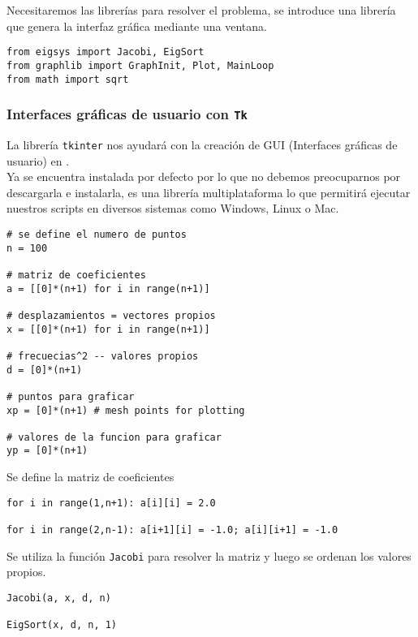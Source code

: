 \begin{frame}[fragile]
Necesitaremos las librerías para resolver el problema, se introduce una librería que genera la interfaz gráfica mediante una ventana.
\begin{lstlisting}[basicstyle=\linespread{0.9}\ttfamily\normalsize, columns=fullflexible]
from eigsys import Jacobi, EigSort
from graphlib import GraphInit, Plot, MainLoop
from math import sqrt
\end{lstlisting}
\end{frame}
\begin{frame}
\frametitle{Interfaces gráficas de usuario con \texttt{Tk}}
La librería \texttt{tkinter} nos ayudará con la creación de GUI (Interfaces gráficas de usuario) en \python.
\\
\bigskip
Ya se encuentra instalada por defecto por lo que no debemos preocuparnos por descargarla e instalarla, es una librería multiplataforma lo que permitirá ejecutar nuestros scripts en diversos sistemas como Windows, Linux o Mac.
\end{frame}
\begin{frame}[fragile]
\begin{lstlisting}[basicstyle=\linespread{0.9}\ttfamily\normalsize, columns=fullflexible]
# se define el numero de puntos
n = 100

# matriz de coeficientes
a = [[0]*(n+1) for i in range(n+1)]

# desplazamientos = vectores propios
x = [[0]*(n+1) for i in range(n+1)]

# frecuecias^2 -- valores propios
d = [0]*(n+1)

# puntos para graficar
xp = [0]*(n+1) # mesh points for plotting

# valores de la funcion para graficar
yp = [0]*(n+1)
\end{lstlisting}
\end{frame}
\begin{frame}[fragile]
Se define la matriz de coeficientes
\\
\medskip
\begin{lstlisting}[basicstyle=\linespread{0.9}\ttfamily\normalsize, columns=fullflexible]
for i in range(1,n+1): a[i][i] = 2.0

for i in range(2,n-1): a[i+1][i] = -1.0; a[i][i+1] = -1.0
\end{lstlisting}
\end{frame}
\begin{frame}[fragile]
Se utiliza la función \texttt{Jacobi} para resolver la matriz y luego se ordenan los valores propios.
\\
\medskip
\begin{lstlisting}[basicstyle=\linespread{0.9}\ttfamily\normalsize, columns=fullflexible]
Jacobi(a, x, d, n)

EigSort(x, d, n, 1)
\end{lstlisting}
\end{frame}
